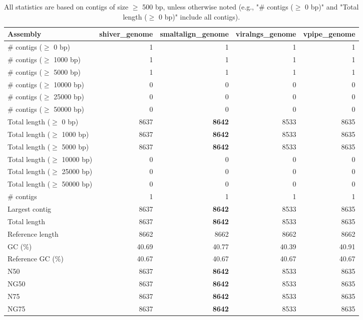 \documentclass[12pt,a4paper]{article}
\begin{document}
\begin{table}[ht]
\begin{center}
\caption{All statistics are based on contigs of size $\geq$ 500 bp, unless otherwise noted (e.g., "\# contigs ($\geq$ 0 bp)" and "Total length ($\geq$ 0 bp)" include all contigs).}
\begin{tabular}{|l*{4}{|r}|}
\hline
Assembly & shiver\_genome & smaltalign\_genome & viralngs\_genome & vpipe\_genome \\ \hline
\# contigs ($\geq$ 0 bp) & 1 & 1 & 1 & 1 \\ \hline
\# contigs ($\geq$ 1000 bp) & 1 & 1 & 1 & 1 \\ \hline
\# contigs ($\geq$ 5000 bp) & 1 & 1 & 1 & 1 \\ \hline
\# contigs ($\geq$ 10000 bp) & 0 & 0 & 0 & 0 \\ \hline
\# contigs ($\geq$ 25000 bp) & 0 & 0 & 0 & 0 \\ \hline
\# contigs ($\geq$ 50000 bp) & 0 & 0 & 0 & 0 \\ \hline
Total length ($\geq$ 0 bp) & 8637 & {\bf 8642} & 8533 & 8635 \\ \hline
Total length ($\geq$ 1000 bp) & 8637 & {\bf 8642} & 8533 & 8635 \\ \hline
Total length ($\geq$ 5000 bp) & 8637 & {\bf 8642} & 8533 & 8635 \\ \hline
Total length ($\geq$ 10000 bp) & 0 & 0 & 0 & 0 \\ \hline
Total length ($\geq$ 25000 bp) & 0 & 0 & 0 & 0 \\ \hline
Total length ($\geq$ 50000 bp) & 0 & 0 & 0 & 0 \\ \hline
\# contigs & 1 & 1 & 1 & 1 \\ \hline
Largest contig & 8637 & {\bf 8642} & 8533 & 8635 \\ \hline
Total length & 8637 & {\bf 8642} & 8533 & 8635 \\ \hline
Reference length & 8662 & 8662 & 8662 & 8662 \\ \hline
GC (\%) & 40.69 & 40.77 & 40.39 & 40.91 \\ \hline
Reference GC (\%) & 40.67 & 40.67 & 40.67 & 40.67 \\ \hline
N50 & 8637 & {\bf 8642} & 8533 & 8635 \\ \hline
NG50 & 8637 & {\bf 8642} & 8533 & 8635 \\ \hline
N75 & 8637 & {\bf 8642} & 8533 & 8635 \\ \hline
NG75 & 8637 & {\bf 8642} & 8533 & 8635 \\ \hline

\end{tabular}
\end{center}
\end{table}
\end{document}
